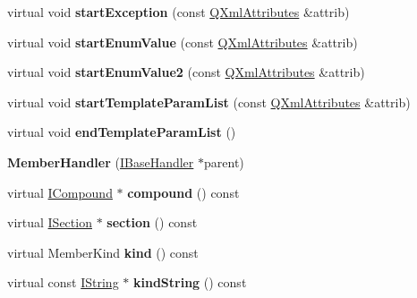 \begin{DoxyCompactItemize}
virtual void {\bfseries start\+Exception} (const \mbox{\hyperlink{class_q_xml_attributes}{Q\+Xml\+Attributes}} \&attrib)
\item 
\mbox{\label{class_member_handler_a63d8d7489aca37ff66fccd11a3d222cf}} 
virtual void {\bfseries start\+Enum\+Value} (const \mbox{\hyperlink{class_q_xml_attributes}{Q\+Xml\+Attributes}} \&attrib)
\item 
\mbox{\label{class_member_handler_a5f2403b541c2b90a6fe1d6aaa8d7cd09}} 
virtual void {\bfseries start\+Enum\+Value2} (const \mbox{\hyperlink{class_q_xml_attributes}{Q\+Xml\+Attributes}} \&attrib)
\item 
\mbox{\label{class_member_handler_a6e0fb71096fef87a975b1e11bf07f65b}} 
virtual void {\bfseries start\+Template\+Param\+List} (const \mbox{\hyperlink{class_q_xml_attributes}{Q\+Xml\+Attributes}} \&attrib)
\item 
\mbox{\label{class_member_handler_a87d41e469f6c370dc36936d699ca5d30}} 
virtual void {\bfseries end\+Template\+Param\+List} ()
\item 
\mbox{\label{class_member_handler_ad67f513d872cdef2ca7d6faea8cbeb8b}} 
{\bfseries Member\+Handler} (\mbox{\hyperlink{class_i_base_handler}{I\+Base\+Handler}} $\ast$parent)
\item 
\mbox{\label{class_member_handler_a997a05482a3d54ab0fdf387584faeb9c}} 
virtual \mbox{\hyperlink{class_i_compound}{I\+Compound}} $\ast$ {\bfseries compound} () const
\item 
\mbox{\label{class_member_handler_a18c18b7caff699b6b20ad5b981d93a31}} 
virtual \mbox{\hyperlink{class_i_section}{I\+Section}} $\ast$ {\bfseries section} () const
\item 
\mbox{\label{class_member_handler_a586ef844972d54bef6fe5c45d7ccf43e}} 
virtual Member\+Kind {\bfseries kind} () const
\item 
\mbox{\label{class_member_handler_ad77346755324df52e93db8e93a6e11c5}} 
virtual const \mbox{\hyperlink{class_i_string}{I\+String}} $\ast$ {\bfseries kind\+String} () const

\end{DoxyCompactItemize}
